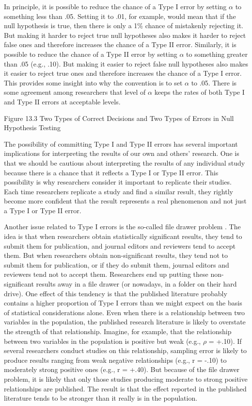 In principle, it is possible to reduce the chance of a Type I error by setting $\alpha$ to something less than .05. Setting it to .01, for example, would mean that if the null hypothesis is true, then there is only a 1\% chance of mistakenly rejecting it. But making it harder to reject true null hypotheses also makes it harder to reject false ones and therefore increases the chance of a Type II error. Similarly, it is possible to reduce the chance of a Type II error by setting $\alpha$ to something greater than .05 (e.g., .10). But making it easier to reject false null hypotheses also makes it easier to reject true ones and therefore increases the chance of a Type I error. This provides some insight into why the convention is to set $\alpha$ to .05.  There is some agreement among researchers that level of $\alpha$ keeps the rates of both Type I and Type II errors at acceptable levels.

Figure 13.3 Two Types of Correct Decisions and Two Types of Errors in Null Hypothesis Testing


 The possibility of committing Type I and Type II errors has several important implications for interpreting the results of our own and others' research. One is that we should be cautious about interpreting the results of any individual study because there is a chance that it reflects a Type I or Type II error. This possibility is why researchers consider it important to replicate their studies. Each time researchers replicate a study and find a similar result, they rightly become more confident that the result represents a real phenomenon and not just a Type I or Type II error.


 Another issue related to Type I errors is the so-called file drawer problem \citep{rosenthal_file_1979}. The idea is that when researchers obtain statistically significant results, they tend to submit them for publication, and journal editors and reviewers tend to accept them. But when researchers obtain non-significant results, they tend not to submit them for publication, or if they do submit them, journal editors and reviewers tend not to accept them. Researchers end up putting these non-significant results away in a file drawer (or nowadays, in a folder on their hard drive). One effect of this tendency is that the published literature probably contains a higher proportion of Type I errors than we might expect on the basis of statistical considerations alone. Even when there is a relationship between two variables in the population, the published research literature is likely to overstate the strength of that relationship. Imagine, for example, that the relationship between two variables in the population is positive but weak (e.g., $\rho$ = +.10). If several researchers conduct studies on this relationship, sampling error is likely to produce results ranging from weak negative relationships (e.g., r = -.10) to moderately strong positive ones (e.g., r = +.40). But because of the file drawer problem, it is likely that only those studies producing moderate to strong positive relationships are published. The result is that the effect reported in the published literature tends to be stronger than it really is in the population.




